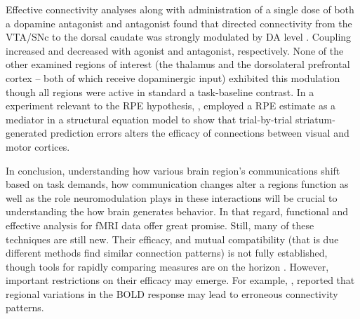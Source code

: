 \documentclass[doc]{apa}        %
\begin{document}
Effective connectivity analyses along with administration of a single dose of both a dopamine antagonist and antagonist found that directed connectivity from the VTA/SNc to the dorsal caudate was strongly modulated by DA level \cite{Honey:2003p1595}. Coupling increased and decreased with agonist and antagonist, respectively.  None of the other examined regions of interest (the thalamus and the dorsolateral prefrontal cortex -- both of which receive dopaminergic input) exhibited this modulation though all regions were active in standard a task-baseline contrast.  In a experiment relevant to the RPE hypothesis, , employed a RPE estimate as a mediator in a structural equation model to show that trial-by-trial striatum-generated prediction errors alters the efficacy of connections between visual and motor cortices.  

In conclusion, understanding how various brain region's communications shift based on task demands, how communication changes alter a regions function as well as the role neuromodulation plays in these interactions will be crucial to understanding the how brain generates behavior.  In that regard,  functional and effective analysis for fMRI data offer great promise.  Still, many of these techniques are still new.  Their efficacy, and mutual compatibility (that is due different methods find similar connection patterns) is not fully established, though tools for rapidly comparing measures are on the horizon \cite{Cui:2008p944}.  However, important restrictions on their efficacy may emerge.  For example, , reported that regional variations in the BOLD response may lead to erroneous connectivity patterns.


\newpage





\end{document}
